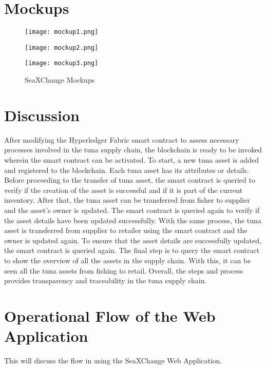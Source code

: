 \section{Mockups}
\begin{figure}[H]
	\centering
	\texttt{[image: mockup1.png]}
	
	\vspace{20pt} %
	
	\texttt{[image: mockup2.png]}
\end{figure}

\clearpage %

\begin{figure}[H]
	\centering
	\texttt{[image: mockup3.png]}
	\caption{SeaXChange Mockups}
	\label{fig:eight_step}
\end{figure}


	
\section{Discussion}
After modifying the Hyperledger Fabric smart contract to assess necessary processes involved in the tuna supply chain, the blockchain is ready to be invoked wherein the smart contract can be activated. To start, a new tuna asset is added and registered to the blockchain. Each tuna asset has its attributes or details. Before proceeding to the transfer of tuna asset, the smart contract is queried to verify if the creation of the asset is successful and if it is part of the current inventory. After that, the tuna asset can be transferred from fisher to supplier and the asset's owner is updated. The smart contract is queried again to verify if the asset details have been updated successfully. With the same process, the tuna asset is transferred from supplier to retailer using the smart contract and the owner is updated again. To ensure that the asset details are successfully updated, the smart contract is queried again. The final step is to query the smart contract to show the overview of all the assets in the supply chain. With this, it can be seen all the tuna assets from fishing to retail. Overall, the steps and process provides transparency and traceability in the tuna supply chain.

\section{Operational Flow of the Web Application}
This will discuss the flow in using the SeaXChange Web Application.

